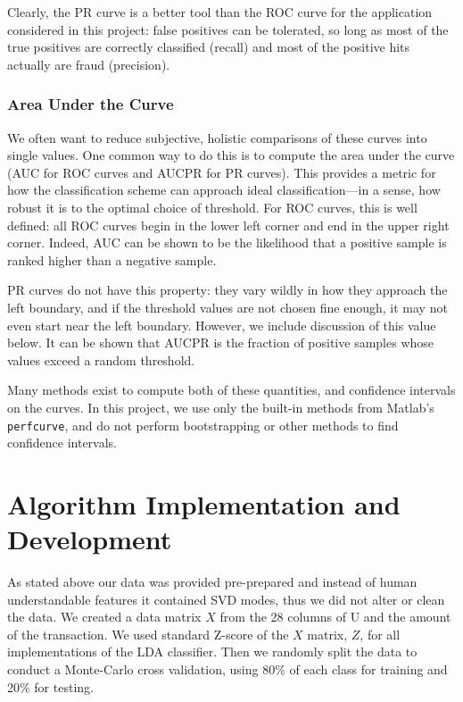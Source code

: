 \documentclass{article}
\begin{document}
Clearly, the PR curve is a better tool than the ROC curve for the application considered in this project: false positives can be tolerated, so long as most of the true positives are correctly classified (recall) and most of the positive hits actually are fraud (precision).

\subsubsection{Area Under the Curve}
We often want to reduce subjective, holistic comparisons of these curves into single values. One common way to do this is to compute the area under the curve (AUC for ROC curves and AUCPR for PR curves). This provides a metric for how  the classification scheme can approach ideal classification---in a sense, how robust it is to the optimal choice of threshold. For ROC curves, this is well defined: all ROC curves begin in the lower left corner and end in the upper right corner. Indeed, AUC can be shown to be the likelihood that a positive sample is ranked higher than a negative sample\cite{Fawcett}.

PR curves do not have this property: they vary wildly in how they approach the left boundary, and if the threshold values are not chosen fine enough, it may not even start near the left boundary. However, we include discussion of this value below. It can be shown that AUCPR is the fraction of positive samples whose values exceed a random threshold\cite{boyd}.

Many methods exist to compute both of these quantities, and confidence intervals on the curves\cite{boyd}\cite{fawcett}. In this project, we use only the built-in methods from Matlab's \texttt{perfcurve}, and do not perform bootstrapping or other methods to find confidence intervals.

\section{Algorithm Implementation and Development}

As stated above our data was provided pre-prepared and instead of human understandable features it contained SVD modes, thus we did not alter or clean the data.
We created a  data matrix $X$ from the 28 columns of U and the amount of the transaction.
We used standard Z-score of the $X$ matrix, $Z$, for all implementations of the LDA classifier.
Then we randomly split the data to conduct a Monte-Carlo cross validation, using 80\% of each class for training and 20\% for testing.
\end{document}
